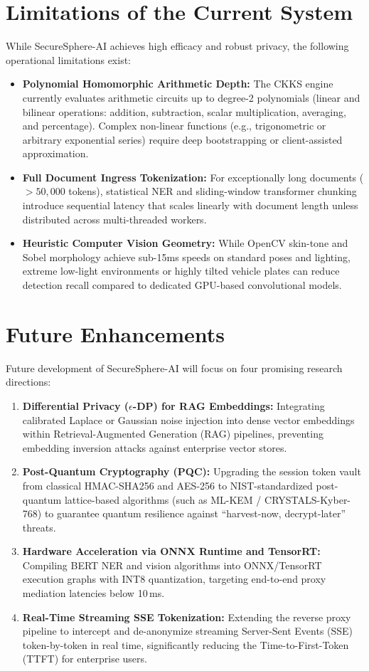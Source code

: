 \documentclass[12pt,a4paper,oneside]{report}
\numberwithin{equation}{chapter}
\begin{document}
\section{Limitations of the Current System}
While SecureSphere-AI achieves high efficacy and robust privacy, the following operational limitations exist:
\begin{itemize}[leftmargin=*]
    \item \textbf{Polynomial Homomorphic Arithmetic Depth:} The CKKS engine currently evaluates arithmetic circuits up to degree-2 polynomials (linear and bilinear operations: addition, subtraction, scalar multiplication, averaging, and percentage). Complex non-linear functions (e.g., trigonometric or arbitrary exponential series) require deep bootstrapping or client-assisted approximation.
    \item \textbf{Full Document Ingress Tokenization:} For exceptionally long documents ($>50,000$ tokens), statistical NER and sliding-window transformer chunking introduce sequential latency that scales linearly with document length unless distributed across multi-threaded workers.
    \item \textbf{Heuristic Computer Vision Geometry:} While OpenCV skin-tone and Sobel morphology achieve sub-15ms speeds on standard poses and lighting, extreme low-light environments or highly tilted vehicle plates can reduce detection recall compared to dedicated GPU-based convolutional models.
\end{itemize}

\section{Future Enhancements}
Future development of SecureSphere-AI will focus on four promising research directions:
\begin{enumerate}[leftmargin=*]
    \item \textbf{Differential Privacy ($\epsilon$-DP) for RAG Embeddings:} Integrating calibrated Laplace or Gaussian noise injection into dense vector embeddings within Retrieval-Augmented Generation (RAG) pipelines, preventing embedding inversion attacks against enterprise vector stores.
    \item \textbf{Post-Quantum Cryptography (PQC):} Upgrading the session token vault from classical HMAC-SHA256 and AES-256 to NIST-standardized post-quantum lattice-based algorithms (such as ML-KEM / CRYSTALS-Kyber-768) to guarantee quantum resilience against ``harvest-now, decrypt-later'' threats.
    \item \textbf{Hardware Acceleration via ONNX Runtime and TensorRT:} Compiling BERT NER and vision algorithms into ONNX/TensorRT execution graphs with INT8 quantization, targeting end-to-end proxy mediation latencies below 10\,ms.
    \item \textbf{Real-Time Streaming SSE Tokenization:} Extending the reverse proxy pipeline to intercept and de-anonymize streaming Server-Sent Events (SSE) token-by-token in real time, significantly reducing the Time-to-First-Token (TTFT) for enterprise users.
\end{enumerate}
\end{document}
